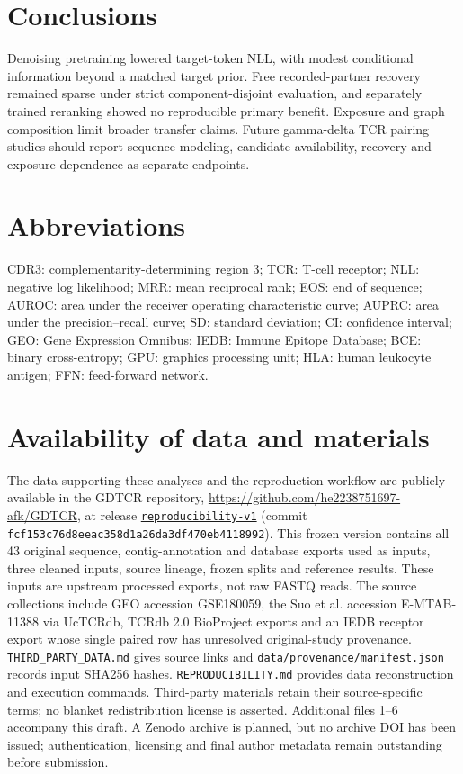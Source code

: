 \documentclass[12pt]{article}
\begin{document}
\section{Conclusions}
Denoising pretraining lowered target-token NLL, with modest conditional
information beyond a matched target prior. Free recorded-partner recovery
remained sparse under strict component-disjoint evaluation, and separately
trained reranking showed no reproducible primary benefit. Exposure and graph
composition limit broader transfer claims. Future gamma-delta TCR pairing
studies should report sequence modeling, candidate availability, recovery and
exposure dependence as separate endpoints.

\section*{Abbreviations}
CDR3: complementarity-determining region 3; TCR: T-cell receptor;
NLL: negative log likelihood; MRR: mean reciprocal rank; EOS: end of sequence;
AUROC: area under the receiver operating characteristic curve;
AUPRC: area under the precision--recall curve; SD: standard deviation;
CI: confidence interval;
GEO: Gene Expression Omnibus; IEDB: Immune Epitope Database;
BCE: binary cross-entropy; GPU: graphics processing unit;
HLA: human leukocyte antigen; FFN: feed-forward network.


\section*{Availability of data and materials}
The data supporting these analyses and the reproduction workflow are publicly
available in the GDTCR repository,
\url{https://github.com/he2238751697-afk/GDTCR}, at release
\href{https://github.com/he2238751697-afk/GDTCR/releases/tag/reproducibility-v1}{\texttt{reproducibility-v1}}
(commit \texttt{fcf153c76d8eeac358d1a26da3df470eb4118992}).
This frozen version contains all 43 original sequence, contig-annotation and
database exports used as inputs, three cleaned inputs, source lineage, frozen
splits and reference results. These inputs are upstream processed exports,
not raw FASTQ reads. The source collections include GEO accession GSE180059,
the Suo et al. accession E-MTAB-11388 via UcTCRdb, TCRdb 2.0 BioProject exports
and an IEDB receptor export whose single paired row has unresolved original-study
provenance. \texttt{THIRD\_PARTY\_DATA.md} gives source links and
\texttt{data/provenance/manifest.json} records input SHA256 hashes.
\texttt{REPRODUCIBILITY.md} provides data reconstruction and execution commands.
Third-party materials retain their source-specific terms; no blanket
redistribution license is asserted. Additional files 1--6 accompany this draft.
A Zenodo archive is planned, but no archive DOI has been issued; authentication,
licensing and final author metadata remain outstanding before submission.
\end{document}

